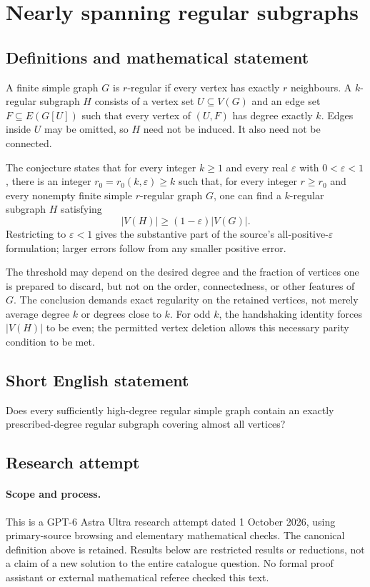 \documentclass[11pt,a4paper]{article}
\begin{document}
\section*{Nearly spanning regular subgraphs}\label{statement}

\subsection{Definitions and mathematical statement}
A finite simple graph $G$ is $r$-regular if every vertex has exactly
$r$ neighbours. A $k$-regular subgraph $H$ consists of a vertex set
$U\subseteq V(G)$ and an edge set $F\subseteq E(G[U])$ such that
every vertex of $(U,F)$ has degree exactly $k$. Edges inside $U$
may be omitted, so $H$ need not be induced. It also need not be
connected.

The conjecture states that for every integer $k\geq1$ and every
real $\varepsilon$ with $0<\varepsilon<1$, there is an integer
$r_0=r_0(k,\varepsilon)\geq k$ such that, for every integer
$r\geq r_0$ and every nonempty finite simple $r$-regular graph $G$,
one can find a $k$-regular subgraph $H$ satisfying
\[
 |V(H)|\geq(1-\varepsilon)|V(G)|.
\]
Restricting to $\varepsilon<1$ gives the substantive part of the
source's all-positive-$\varepsilon$ formulation; larger errors
follow from any smaller positive error.

The threshold may depend on the desired degree and the fraction
of vertices one is prepared to discard, but not on the order,
connectedness, or other features of $G$. The conclusion demands
exact regularity on the retained vertices, not merely average
degree $k$ or degrees close to $k$. For odd $k$, the handshaking
identity forces $|V(H)|$ to be even; the permitted vertex deletion
allows this necessary parity condition to be met.
\subsection{Short English statement}
Does every sufficiently high-degree regular simple graph contain an exactly prescribed-degree regular subgraph covering almost all vertices?
\subsection{Research attempt}
\paragraph{Scope and process.}
This is a GPT-6 Astra Ultra research attempt dated 1 October 2026, using
primary-source browsing and elementary mathematical checks. The canonical
definition above is retained. Results below are restricted results or
reductions, not a claim of a new solution to the entire catalogue question.
No formal proof assistant or external mathematical referee checked this text.
\end{document}
